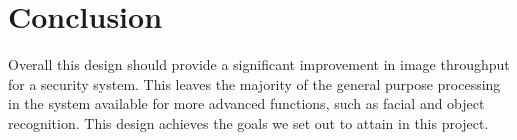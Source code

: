 \section{Conclusion}
Overall this design should provide a significant improvement in image throughput for a security system.  This leaves the majority of the general purpose processing in the system available for more advanced functions, such as facial and object recognition.  This design achieves the goals we set out to attain in this project.
